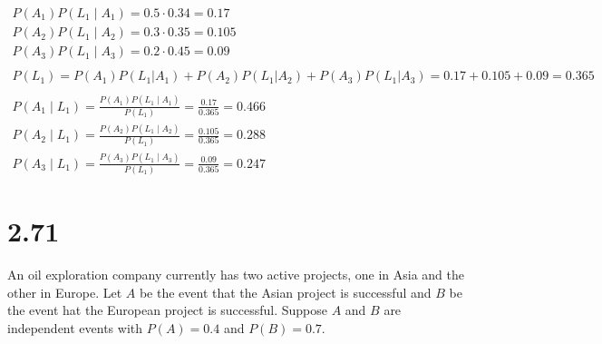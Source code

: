 \documentclass[letterpaper,12pt,fleqn]{article}
\begin{document}
\begin{gather*}
  P(A_1)P(L_1\mid A_1)=0.5\cdot0.34=0.17 \\
  P(A_2)P(L_1\mid A_2)=0.3\cdot0.35=0.105 \\
  P(A_3)P(L_1\mid A_3)=0.2\cdot0.45=0.09 \\
  \\
  P(L_1)=P(A_1)P(L_1|A_1)+P(A_2)P(L_1|A_2)+P(A_3)P(L_1|A_3)=0.17+0.105+0.09=0.365 \\
  \\
  P(A_1\mid L_1)=\frac{P(A_1)P(L_1\mid A_1)}{P(L_1)}=\frac{0.17}{0.365}=0.466 \\
  P(A_2\mid L_1)=\frac{P(A_2)P(L_1\mid A_2)}{P(L_1)}=\frac{0.105}{0.365}=0.288 \\
  P(A_3\mid L_1)=\frac{P(A_3)P(L_1\mid A_3)}{P(L_1)}=\frac{0.09}{0.365}=0.247
\end{gather*}

\section*{2.71}

An oil exploration company currently has two active projects, one in Asia and the other in Europe.  Let \(A\) be the event
that the Asian project is successful and \(B\) be the event hat the European project is successful.  Suppose \(A\) and \(B\)
are independent events with \(P(A)=0.4\) and \(P(B)=0.7\).

\bigskip

\begin{center}
\end{center}

\bigskip
\end{document}
